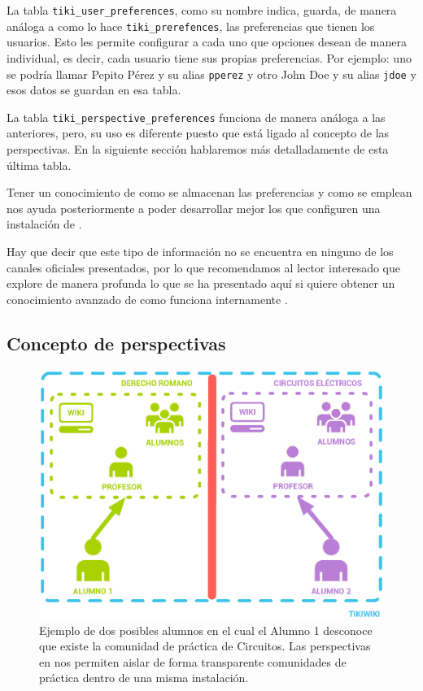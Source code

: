 La tabla \texttt{tiki\_user\_preferences}, como su nombre indica, guarda, de manera análoga a como lo hace \texttt{tiki\_prerefences}, las preferencias que tienen los usuarios. Esto les permite configurar a cada uno que opciones desean de manera individual, es decir, cada usuario tiene sus propias preferencias. Por ejemplo: uno se podría llamar Pepito Pérez y su alias \texttt{pperez} y otro John Doe y su alias \texttt{jdoe} y esos datos se guardan en esa tabla.

La tabla \texttt{tiki\_perspective\_preferences} funciona de manera análoga a las anteriores, pero, su uso es diferente puesto que está ligado al concepto de las perspectivas. En la siguiente sección hablaremos más detalladamente de esta última tabla.

Tener un conocimiento de como se almacenan las preferencias y como se emplean nos ayuda posteriormente a poder desarrollar mejor los \profiles{} que configuren una instalación de \tiki{}.

Hay que decir que este tipo de información no se encuentra en ninguno de los canales oficiales presentados, por lo que recomendamos al lector interesado que explore de manera profunda lo que se ha presentado aquí si quiere obtener un conocimiento avanzado de como funciona internamente \tiki{}.

\subsection{Concepto de perspectivas}
\label{section:concepto_perspectivas}

\begin{figure}
\centering
\includegraphics[width=.8\linewidth]{../graphics/fig_comunidad_de_practica_perspectivas.eps}
\caption{Ejemplo de dos posibles alumnos en el cual el Alumno 1 desconoce que existe la comunidad de práctica de Circuitos. Las perspectivas en \tiki{} nos permiten aislar de forma transparente comunidades de práctica dentro de una misma instalación.}\label{fig:comunidad_de_practica_perspectivas}
\end{figure}

